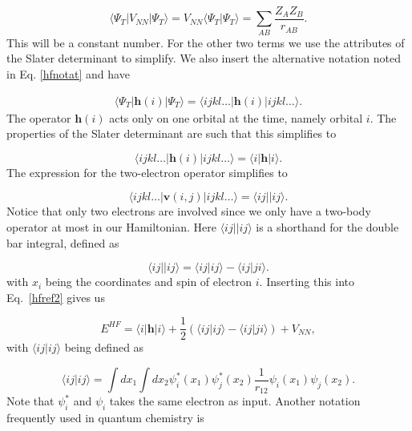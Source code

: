 \documentclass[a4paper,norsk,11pt,twoside]{report}
\begin{document}
\begin{equation}
\langle \Psi_T | V_{NN} | \Psi_T \rangle = V_{NN} \langle \Psi_T | \Psi_T \rangle
= \sum_{AB} \frac{Z_A Z_B}{r_{AB}}.
\end{equation}
This will be a constant number. For the other two terms we use the
attributes of the Slater determinant to simplify. We also insert the
alternative notation noted in Eq. \eqref{hfnotat} and have

\begin{align}
\langle \Psi_T | \textbf{h}(i) | \Psi_T \rangle
 = \langle i j k l \dots | \textbf{h}(i) | i j k l \dots \rangle .
\end{align}
The operator $\textbf{h}(i)$ acts only on one orbital at the time, namely orbital $i$. The properties of the Slater determinant are such that this simplifies to

\begin{equation}
\langle i j k l \dots | \textbf{h}(i) | i j k l \dots \rangle = \langle i | \textbf{h} | i \rangle .
\end{equation}
The expression for the two-electron operator simplifies to

\begin{equation}
\langle i j k l  \dots | \textbf{v}(i,j) | i j k l \dots \rangle = \langle ij || ij \rangle .
\end{equation}
Notice that only two electrons are involved since we only have a two-body operator at most in our Hamiltonian. 
Here $\langle ij || ij \rangle$ is a shorthand for the double bar integral, defined as

\begin{equation}
\langle ij || ij \rangle = \langle ij | ij \rangle - \langle ij | ji \rangle .
\end{equation}
with $x_i$ being the coordinates and spin of electron $i$. 
Inserting this into Eq.~\eqref{hfref2} gives us

\begin{equation}
E^{HF} = 
\langle i | \textbf{h} | i \rangle 
+ \frac{1}{2} \left( \langle ij | ij \rangle - \langle ij | ji \rangle \right)
+ V_{NN} ,
\end{equation}
with $\langle ij | ij \rangle$ being defined as

\begin{equation}
\langle ij | ij \rangle = \int dx_1 \int dx_2 \psi_i^*(x_1) \psi_j^*(x_2) \frac{1}{r_{12}} \psi_i(x_1) \psi_j(x_2) .
\end{equation}
Note that $\psi_i^*$ and $\psi_i$ takes the same electron as input. Another notation frequently used in quantum chemistry is 
\end{document}
